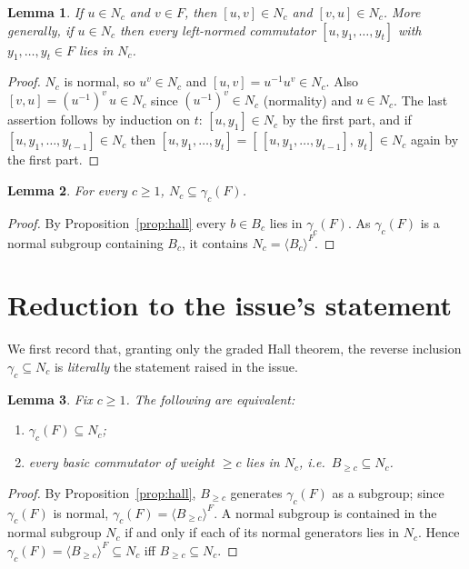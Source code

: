 \documentclass{amsart}
\newtheorem{lemma}{Lemma}
\theoremstyle{definition}
\theoremstyle{remark}
\begin{document}
\begin{lemma}\label{lem:caseA}
If $u\in N_c$ and $v\in F$, then $[u,v]\in N_c$ and $[v,u]\in N_c$. More generally,
if $u\in N_c$ then every left-normed commutator $[u,y_1,\dots,y_t]$ with
$y_1,\dots,y_t\in F$ lies in $N_c$.
\end{lemma}

\begin{proof}
$N_c$ is normal, so $u^{v}\in N_c$ and $[u,v]=u^{-1}u^{v}\in N_c$. Also
$[v,u]=(u^{-1})^{v}\,u\in N_c$ since $(u^{-1})^{v}\in N_c$ (normality) and
$u\in N_c$. The last assertion follows by induction on $t$: $[u,y_1]\in N_c$ by
the first part, and if $[u,y_1,\dots,y_{t-1}]\in N_c$ then
$[u,y_1,\dots,y_t]=[\,[u,y_1,\dots,y_{t-1}],\,y_t]\in N_c$ again by the first part.
\end{proof}

\begin{lemma}\label{lem:easy}
For every $c\ge1$, $N_c\subseteq\gamma_c(F)$.
\end{lemma}

\begin{proof}
By Proposition~\ref{prop:hall} every $b\in B_c$ lies in $\gamma_c(F)$. As
$\gamma_c(F)$ is a normal subgroup containing $B_c$, it contains
$N_c=\langle B_c\rangle^{F}$.
\end{proof}

\section{Reduction to the issue's statement}\label{sec:reduce0}

We first record that, granting only the graded Hall theorem, the reverse inclusion
$\gamma_c\subseteq N_c$ is \emph{literally} the statement raised in the issue.

\begin{lemma}\label{lem:reduce-to-Bw}
Fix $c\ge1$. The following are equivalent:
\begin{enumerate}
\item[(i)] $\gamma_c(F)\subseteq N_c$;
\item[(ii)] every basic commutator of weight $\ge c$ lies in $N_c$, i.e.\
$B_{\ge c}\subseteq N_c$.
\end{enumerate}
\end{lemma}

\begin{proof}
By Proposition~\ref{prop:hall}, $B_{\ge c}$ generates $\gamma_c(F)$ as a subgroup;
since $\gamma_c(F)$ is normal, $\gamma_c(F)=\langle B_{\ge c}\rangle^{F}$. A normal
subgroup is contained in the normal subgroup $N_c$ if and only if each of its
normal generators lies in $N_c$. Hence
$\gamma_c(F)=\langle B_{\ge c}\rangle^{F}\subseteq N_c$ iff $B_{\ge c}\subseteq
N_c$.
\end{proof}
\end{document}
